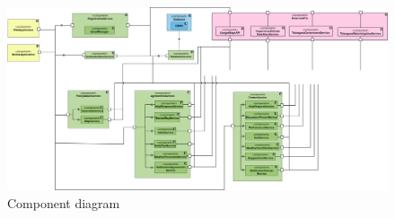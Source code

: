 \begin{landscape}
\begin{figure}[h]
\vspace*{-2cm}
\noindent
\centering
\centerline{\includegraphics[scale = 0.2]{./Images/Component diagram.png}}
    \caption{Component diagram}
    \vspace*{-12cm}
\end{figure}
\fillandplacepagenumber
\end{landscape}

